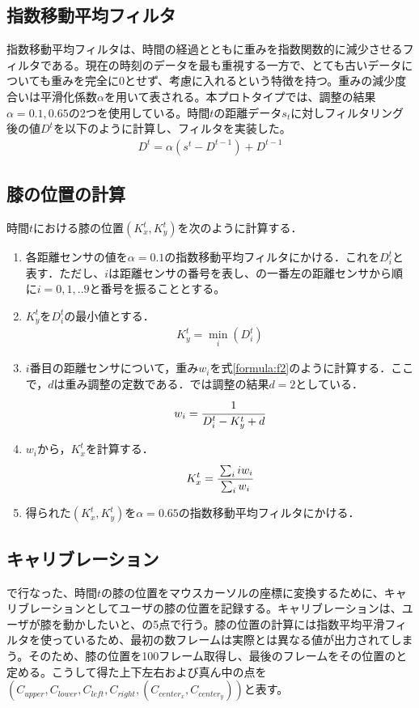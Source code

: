 \subsection{指数移動平均フィルタ}
指数移動平均フィルタは、時間の経過とともに重みを指数関数的に減少させるフィルタである。現在の時刻のデータを最も重視する一方で、とても古いデータについても重みを完全に0とせず、考慮に入れるという特徴を持つ。重みの減少度合いは平滑化係数$\alpha$を用いて表される。本プロトタイプでは、調整の結果$\alpha = 0.1, 0.65$の2つを使用している。時間$t$の距離データ$s_t$に対しフィルタリング後の値$D^t$を以下のように計算し、フィルタを実装した。
\begin{eqnarray}
	D^t = \alpha (s^t - D^{t-1}) + D^{t-1}
\end{eqnarray}
\subsection{膝の位置の計算}
時間$t$における膝の位置$(K^t_x, K^t_y)$を次のように計算する．
\begin{enumerate}
	\item 各距離センサの値を$\alpha=0.1$の指数移動平均フィルタにかける．これを$D^t_i$と表す．ただし、$i$は距離センサの番号を表し、の一番左の距離センサから順に$i=0,1,..9$と番号を振ることとする。
	\item $K^t_y$を$D^t_i $の最小値とする．
		\begin{eqnarray}
		 	K^t_y = \min_i(D^t_i)
		 	\label{formula:f1}
		\end{eqnarray}
	\item $i$番目の距離センサについて，重み$w_i$を式\ref{formula:f2}のように計算する．ここで，$d$は重み調整の定数である．\SysName では調整の結果$d=2$としている．
		\begin{eqnarray}
			w_i = \cfrac{1}{D^t_i - K^t_y + d}
		\label{formula:f2}
	\end{eqnarray}
	\item $w_i$から，$K^t_x$を計算する．
		\begin{eqnarray}
		 	 K^t_x=\cfrac{\sum_i iw_i}{\sum_i w_i}
		 	\label{formula:f3}
		\end{eqnarray} 
	\item 得られた$(K^t_x, K^t_y)$を$\alpha=0.65$の指数移動平均フィルタにかける．
\end{enumerate}
\subsection{キャリブレーション}
で行なった、時間$t$の膝の位置をマウスカーソルの座標に変換するために、キャリブレーションとしてユーザの膝の位置を記録する。キャリブレーションは、ユーザが膝を動かしたいと、の5点で行う。膝の位置の計算には指数平均平滑フィルタを使っているため、最初の数フレームは実際とは異なる値が出力されてしまう。そのため、膝の位置を100フレーム取得し、最後のフレームをその位置のと定める。こうして得た上下左右および真ん中の点を$(C_{upper}, C_{lower}, C_{left}, C_{right}, (C_{center_x}, C_{center_y}))$と表す。

